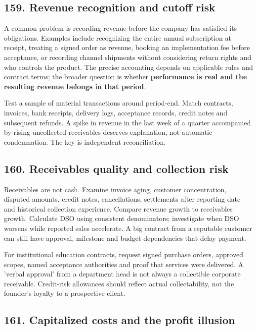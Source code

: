 \subsection{159. Revenue recognition and cutoff risk}


A common problem is recording revenue before the company has satisfied its obligations. Examples include recognizing the entire annual subscription at receipt, treating a signed order as revenue, booking an implementation fee before acceptance, or recording channel shipments without considering return rights and who controls the product. The precise accounting depends on applicable rules and contract terms; the broader question is whether \textbf{performance is real and the resulting revenue belongs in that period}.

Test a sample of material transactions around period-end. Match contracts, invoices, bank receipts, delivery logs, acceptance records, credit notes and subsequent refunds. A spike in revenue in the last week of a quarter accompanied by rising uncollected receivables deserves explanation, not automatic condemnation. The key is independent reconciliation.

\subsection{160. Receivables quality and collection risk}


Receivables are not cash. Examine invoice aging, customer concentration, disputed amounts, credit notes, cancellations, settlements after reporting date and historical collection experience. Compare revenue growth to receivables growth. Calculate DSO using consistent denominators; investigate when DSO worsens while reported sales accelerate. A big contract from a reputable customer can still have approval, milestone and budget dependencies that delay payment.

For institutional education contracts, request signed purchase orders, approved scopes, named acceptance authorities and proof that services were delivered. A 'verbal approval' from a department head is not always a collectible corporate receivable. Credit-risk allowances should reflect actual collectability, not the founder's loyalty to a prospective client.

\subsection{161. Capitalized costs and the profit illusion}


